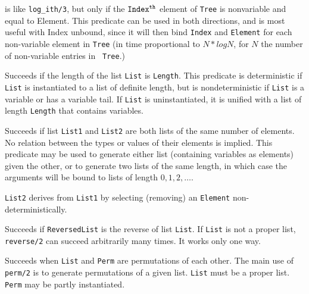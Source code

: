 \begin{description}
    is like {\tt log\_ith/3}, but only if the ${\tt Index^{th}}$ element
    of {\tt Tree} is nonvariable and equal to Element.  This predicate
    can be used in both directions, and is most useful with Index
    unbound, since it will then bind {\tt Index} and {\tt Element} for
    each non-variable element in {\tt Tree} (in time proportional to
    $N*logN$, for $N$ the number of non-variable entries in {\tt
    Tree}.)

    Succeeds if the length of the list {\tt List} is {\tt Length}.
    This predicate is deterministic if {\tt List} is instantiated 
    to a list of definite length, but is nondeterministic if 
    {\tt List} is a variable or has a variable tail.  If {\tt List}
    is uninstantiated, it is unified with a list of length {\tt Length}
    that contains variables.

    Succeeds if list {\tt List1} and {\tt List2} are both lists of
    the same number of elements.  No relation between the types or
    values of their elements is implied.  This predicate may be used
    to generate either list (containing variables as elements) given
    the other, or to generate two lists of the same length, in which
    case the arguments will be bound to lists of length $0,1,2,\ldots$.

    {\tt List2} derives from {\tt List1} by selecting (removing) an 
    {\tt Element} non-deterministically.

    Succeeds if {\tt ReversedList} is the reverse of list {\tt List}.
    If {\tt List} is not a proper list, {\tt reverse/2} can succeed
    arbitrarily many times.  It works only one way.

    Succeeds when {\tt List} and {\tt Perm} are permutations of each
    other.  The main use of {\tt perm/2} is to generate permutations
    of a given list.  {\tt List} must be a proper list.
    {\tt Perm} may be partly instantiated.


\end{description}
